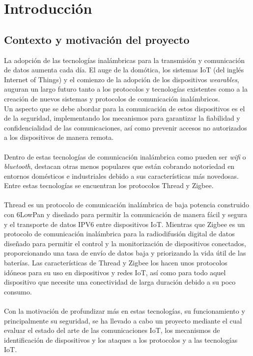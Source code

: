 \chapter{Introducción} %
\section{Contexto y motivación del proyecto} %
La adopción de las tecnologías inalámbricas para la transmisión y comunicación de datos aumenta cada día. El auge de la domótica, los sistemas IoT (del inglés Internet of Things) y el comienzo de la adopción de los dispositivos \textit{wearables}, auguran un largo futuro tanto a los protocolos y tecnologías existentes como a la creación de nuevos sistemas y protocolos de comunicación inalámbricos.
\\Un aspecto que se debe abordar para la comunicación de estos dispositivos es el de la seguridad, implementando los mecanismos para garantizar la fiabilidad y confidencialidad de las comunicaciones, así como prevenir accesos no autorizados a los dispositivos de manera remota.
\\\\
Dentro de estas tecnologías de comunicación inalámbrica como pueden ser \textit{wifi} o \textit{bluetooth}, destacan otras menos populares que están cobrando notoriedad en entornos domésticos e industriales debido a sus características más novedosas. Entre estas tecnologías se encuentran los protocolos Thread y Zigbee.
\\\\Thread es un protocolo de comunicación inalámbrica de baja potencia construido con 6LowPan \cite{especificacionthread} y diseñado para permitir la comunicación de manera fácil y segura y el transporte de datos IPV6 entre dispositivos IoT. Mientras que Zigbee es un protocolo de comunicación inalámbrica para la radiodifusión digital de datos diseñado para permitir el control y la monitorización de dispositivos conectados, proporcionando una tasa de envío de datos baja y priorizando la vida útil de las baterías. Las características de Thread y Zigbee los hacen unos protocolos idóneos para su uso en dispositivos y redes IoT, así como para todo aquel dispositivo que necesite una conectividad de larga duración debido a su poco consumo.
\\\\
Con la motivación de profundizar más en estas tecnologías, su funcionamiento y principalmente su seguridad, se ha llevado a cabo un proyecto mediante el cual evaluar el estado del arte de las comunicaciones IoT, los mecanismos de identificación de dispositivos y los ataques a los protocolos y a las tecnologías IoT.
\clearpage




